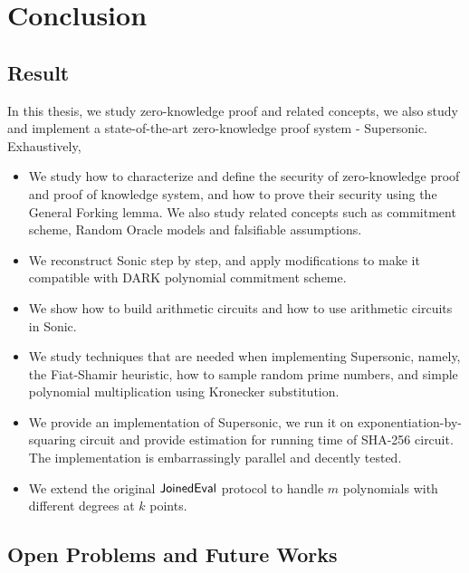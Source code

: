 \chapter{Conclusion}
\label{chap-conclusion}

\section{Result}

In this thesis, we study zero-knowledge proof and related concepts, we also study and implement a state-of-the-art zero-knowledge proof system - Supersonic. Exhaustively,
\begin{itemize}
    \item We study how to characterize and define the security of zero-knowledge proof and proof of knowledge system, and how to prove their security using the General Forking lemma. We also study related concepts such as commitment scheme, Random Oracle models and falsifiable assumptions.
    \item We reconstruct Sonic step by step, and apply modifications to make it compatible with DARK polynomial commitment scheme.
    \item We show how to build arithmetic circuits and how to use arithmetic circuits in Sonic.
    \item We study techniques that are needed when implementing Supersonic, namely, the Fiat-Shamir heuristic, how to sample random prime numbers, and simple polynomial multiplication using Kronecker substitution.
    \item We provide an implementation of Supersonic, we run it on exponentiation-by-squaring circuit and provide estimation for running time of SHA-256 circuit. The implementation is embarrassingly parallel and decently tested.
    \item We extend the original $\mathsf{JoinedEval}$ protocol to handle $m$ polynomials with different degrees at $k$ points.
\end{itemize}

\section{Open Problems and Future Works}

